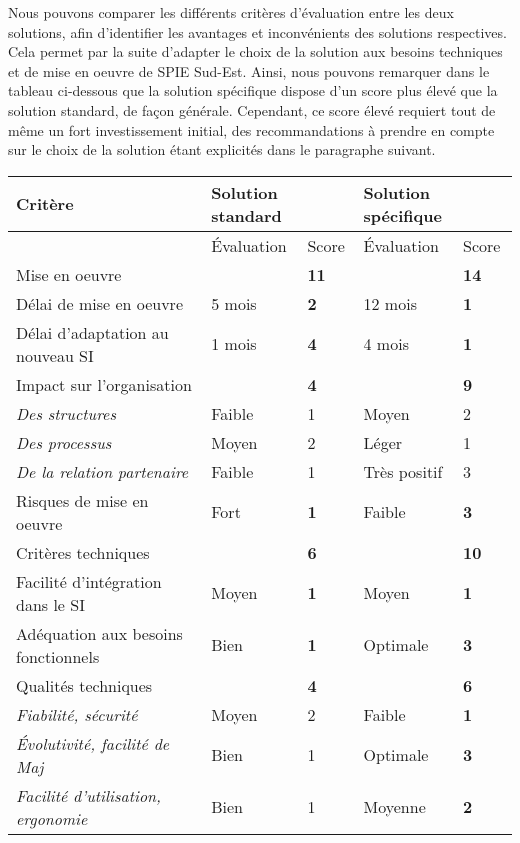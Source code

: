 
Nous pouvons comparer les différents critères d’évaluation entre les deux solutions, afin d’identifier les avantages et inconvénients des solutions respectives. Cela permet par la suite d’adapter le choix de la solution aux besoins techniques et de mise en oeuvre de SPIE Sud-Est. Ainsi, nous pouvons remarquer dans le tableau ci-dessous que la solution spécifique dispose d’un score plus élevé que la solution standard, de façon générale. Cependant, ce score élevé requiert tout de même un fort investissement initial, des recommandations à prendre en compte sur le choix de la solution étant explicités dans le paragraphe suivant.

\begin{table}[H]
    \begin{tabular}{p{6cm}|p{2cm}|p{2cm}|p{3cm}|p{2cm}}
    Critère                             & \multicolumn{2}{l}{Solution standard} & \multicolumn{2}{l}{Solution spécifique} \\ \hline
    ~                                   & Évaluation & Score   & Évaluation   & Score   \\ \hline
    Mise en oeuvre                         & ~       & \bf{11} & ~            & \bf{14} \\ \hline
    Délai de mise en oeuvre                & 5 mois  & \bf{2}  & 12 mois      & \bf{1}  \\
    Délai d'adaptation au nouveau SI       & 1 mois  & \bf{4}  & 4 mois       & \bf{1}  \\ \hline
    Impact sur l'organisation              & ~       & \bf{4}  & ~            & \bf{9}  \\ \hline
    \it{Des structures}                    & Faible  & 1       & Moyen        & 2       \\
    \it{Des processus}                     & Moyen   & 2       & Léger        & 1       \\
    \it{De la relation partenaire}         & Faible  & 1       & Très positif & 3       \\ \hline
    Risques de mise en oeuvre              & Fort    & \bf{1}  & Faible       & \bf{3}  \\ \hline
    Critères techniques                    & ~       & \bf{6}  & ~            & \bf{10} \\ \hline
    Facilité d'intégration dans le SI      & Moyen   & \bf{1}  & Moyen        & \bf{1}  \\
    Adéquation aux besoins fonctionnels    & Bien    & \bf{1}  & Optimale     & \bf{3}  \\ \hline
    Qualités techniques                    & ~       & \bf{4}  & ~            & \bf{6}  \\ \hline
    \it{Fiabilité, sécurité}               & Moyen   & 2       & Faible       & \bf{1}  \\
    \it{Évolutivité, facilité de Maj}      & Bien    & 1       & Optimale     & \bf{3}  \\
    \it{Facilité d'utilisation, ergonomie} & Bien    & 1       & Moyenne      & \bf{2}  \\
    \end{tabular}
\end{table}